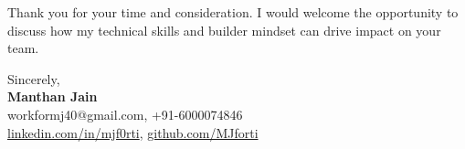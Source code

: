 \documentclass[letterpaper,10pt]{article}
\begin{document}
\vspace{6pt}
Thank you for your time and consideration. I would welcome the opportunity to discuss how my technical skills and builder mindset can drive impact on your team.

\vspace{10pt}
Sincerely, \\[10pt]
\textbf{Manthan Jain} \\
\small
workformj40@gmail.com, +91-6000074846 \\
\href{https://www.linkedin.com/in/mjf0rti}{linkedin.com/in/mjf0rti}, \href{https://github.com/MJforti}{github.com/MJforti}
\end{document}
